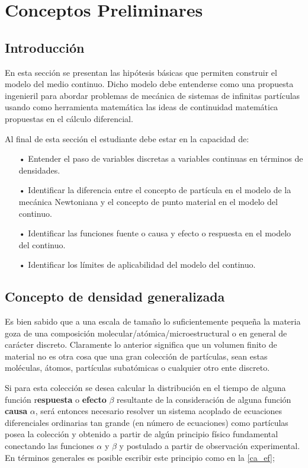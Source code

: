 \documentclass[../notas medios.tex]{subfiles}
\begin{document}
\chapter{Conceptos Preliminares}

\graphicspath{{IMAGES/Cap1/}}
\section{Introducción}
En esta sección se presentan las hipótesis básicas que permiten construir el modelo del medio continuo. Dicho modelo debe entenderse como una propuesta ingenieril para abordar problemas de mecánica de sistemas de infinitas partículas usando como herramienta matemática las ideas de continuidad matemática propuestas en el cálculo diferencial.

Al final de esta sección el estudiante debe estar en la capacidad de:
%
\begin{itemize}
\item[•] Entender el paso de variables discretas a variables continuas en términos de densidades.
\item[•] Identificar la diferencia entre el concepto de partícula en el modelo de la mecánica Newtoniana y el concepto de punto material en el modelo del continuo.
\item[•] Identificar las funciones fuente o causa y efecto o respuesta en el modelo del continuo.
\item[•] Identificar los límites de aplicabilidad del modelo del continuo.
\end{itemize}
%
\section{Concepto de densidad generalizada}
Es bien sabido que a una escala de tamaño lo suficientemente pequeña la materia goza de una composición molecular/atómica/microestructural o en general de carácter discreto.  Claramente lo anterior significa que un volumen finito de material no es otra cosa que una gran colección de partículas, sean estas moléculas, átomos, partículas subatómicas o cualquier otro ente discreto.

Si para esta colección se desea calcular la distribución en el tiempo de alguna función r{\bf espuesta} o {\bf efecto} $\beta$ resultante de la consideración de alguna función {\bf causa} $\alpha$, será entonces necesario resolver un sistema acoplado de ecuaciones diferenciales ordinarias tan grande (en número de ecuaciones) como partículas posea la colección y obtenido a partir de algún principio físico fundamental conectando las funciones $\alpha$ y $\beta$ y postulado a partir de observación experimental.  En términos generales es posible escribir este principio como en la \cref{ca_ef};
\end{document}
